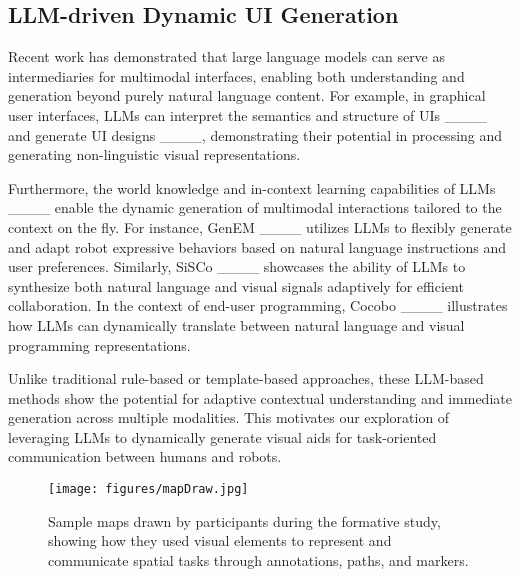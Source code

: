 \subsection{LLM-driven Dynamic UI Generation}

Recent work has demonstrated that large language models can serve as intermediaries for multimodal interfaces, enabling both understanding and generation beyond purely natural language content. For example, in graphical user interfaces, LLMs can interpret the semantics and structure of UIs ____ and generate UI designs ____, demonstrating their potential in processing and generating non-linguistic visual representations.

Furthermore, the world knowledge and in-context learning capabilities of LLMs ____ enable the dynamic generation of multimodal interactions tailored to the context on the fly. For instance, GenEM ____ utilizes LLMs to flexibly generate and adapt robot expressive behaviors based on natural language instructions and user preferences. Similarly, SiSCo ____ showcases the ability of LLMs to synthesize both natural language and visual signals adaptively for efficient collaboration. In the context of end-user programming, Cocobo ____ illustrates how LLMs can dynamically translate between natural language and visual programming representations.

Unlike traditional rule-based or template-based approaches, these LLM-based methods show the potential for adaptive contextual understanding and immediate generation across multiple modalities. This motivates our exploration of leveraging LLMs to dynamically generate visual aids for task-oriented communication between humans and robots.







\begin{figure*}
  \centering
  \texttt{[image: figures/mapDraw.jpg]}
  \caption{Sample maps drawn by participants during the formative study, showing how they used visual elements to represent and communicate spatial tasks through annotations, paths, and markers.}
  \label{fig:paper map}
\end{figure*}